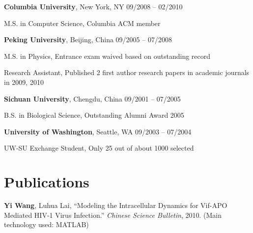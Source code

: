 \documentclass[margin,line]{resume}
\begin{document}
\begin{resume}
    \textbf{Columbia University}, New York, NY \hfill 09/2008 -- 02/2010 \vspace{-3mm}\\\vspace{-1mm}%
      \begin{list2}
       \item M.S. in Computer Science, Columbia ACM member
      \end{list2}
 

    \textbf{Peking University}, Beijing, China \hfill 09/2005 -- 07/2008 \vspace{-3mm}\\\vspace{-1mm}%
      \begin{list2}
       \item M.S. in Physics, Entrance exam waived based on outstanding record
       \item Research Assistant, Published 2 first author research papers in academic journals in 2009, 2010
      \end{list2}
    
    \textbf{Sichuan University}, Chengdu, China \hfill 09/2001 -- 07/2005 \vspace{-3mm}\\\vspace{-1mm}%
      \begin{list2}
       \item B.S. in Biological Science, Outstanding Alumni Award 2005
      \end{list2}

    \textbf{University of Washington}, Seattle, WA \hfill 09/2003 -- 07/2004 \vspace{-3mm}\\\vspace{-1mm}%
      \begin{list2}
       \item  UW-SU Exchange Student, Only 25 out of about 1000 selected
      \end{list2}


    \section{\mysidestyle Publications}

      \textbf{Yi Wang}, Luhua Lai, ``Modeling the Intracellular Dynamics for Vif-APO Mediated HIV-1 Virus Infection.''
      \textsl{Chinese Science Bulletin}, 2010. (Main technology used: MATLAB) 


\end{resume}
\end{document}
